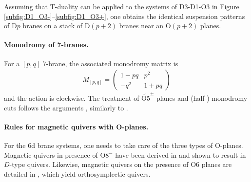 \documentclass[a4paper,11pt]{article}
\begin{document}
Assuming that T-duality can be applied to the systems of D3-D1-O3 in Figure \ref{subfig:D1_O3-}--\ref{subfig:D1_O3+}, one obtains the identical suspension patterns of D$p$ branes on a stack of D$(p+2)$ branes near an O$(p+2)$ planes. 
% 
\paragraph{Monodromy of 7-branes.} For a $[p,q]$ 7-brane, the associated monodromy matrix is
\begin{align}
M_{[p,q]} = \begin{pmatrix} 1-p q & p^2 \\ - q^2 & 1+ pq
\end{pmatrix}
\end{align}
and the action is clockwise. The treatment of $\widetilde{\mathrm{O5}}^\pm$ planes and (half-) monodromy cuts follows the arguments \cite{Zafrir:2015ftn}, similarly to \cite[App.\ A]{Bourget:2020gzi}.
% 
\paragraph{Rules for magnetic quivers with O-planes.}
For the 6d brane systems, one needs to take care of the three types of O-planes. Magnetic quivers in presence of O8${}^-$ have been derived in \cite{Cabrera:2019izd} and shown to result in $D$-type quivers. Likewise, magnetic quivers on the presence of O6 planes are detailed in \cite{Cabrera:2019dob}, which yield orthosymplectic quivers.
\end{document}

